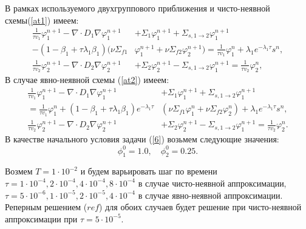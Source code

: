 В рамках используемого двухгруппового приближения и чисто-неявной схемы(\ref{at1}) имеем: 
\begin{equation}\label{n1}
\begin{split}
\frac{1}{\tau v_1} \varphi_1^{n+1} - \nabla \cdot D_1 \nabla \varphi_1^{n+1} & + \Sigma_1 \varphi_1^{n+1} + \Sigma_{s,1\rightarrow 2} \varphi_1^{n+1}\\  
 -(1-\beta_1+\tau\lambda_1\beta_1)(\nu \Sigma_{f1} &\varphi_1^{n+1} + \nu \Sigma_{f2} \varphi_2^{n+1}) 
 = \frac{1}{\tau v_1}   \varphi_1^{n} + \lambda_1 e^{-\lambda_1\tau}s^n, \\
\frac{1}{\tau v_2} \varphi_2^{n+1} - \nabla \cdot D_2 \nabla \varphi_2^{n+1} & + \Sigma_2 \varphi_2^{n+1} - \Sigma_{s,1\rightarrow 2} \varphi_1^{n+1}  
 = \frac{1}{\tau v_2}\varphi_2^{n}, 
\end{split}
\end{equation} 
В случае явно-неявной схемы (\ref{at2}) имеем:
\begin{equation}\label{n2}
\begin{split}
\frac{1}{\tau v_1} \varphi_1^{n+1} - \nabla \cdot D_1 \nabla \varphi_1^{n+1} & + \Sigma_1 \varphi_1^{n+1} + \Sigma_{s,1\rightarrow 2} \varphi_1^{n+1} \\ 
 = \frac{1}{\tau v_1}   \varphi_1^{n} + (1-\beta_1 + \tau\lambda_1\beta_1)e^{-\lambda_1\tau}&(\nu \Sigma_{f1} \varphi_1^{n} + \nu \Sigma_{f2} \varphi_2^{n})+\lambda_1 e^{-\lambda_1\tau} s^n, \\
\frac{1}{\tau v_2} \varphi_2^{n+1} - \nabla \cdot D_2 \nabla \varphi_2^{n+1} & + \Sigma_2 \varphi_2^{n+1} - \Sigma_{s,1\rightarrow 2} \varphi_1^{n+1}  
 = \frac{1}{\tau v_2}\varphi_2^{n}.
\end{split}
\end{equation} 
В качестве начального условия задачи (\ref{6}) возьмем следующие значения: 
\[ 
\phi_1^0 = 1.0, \quad \phi_2^0 = 0.25.
\]

Возмем $T=1\cdot 10^{-2}$ и будем варьировать шаг по времени $\tau = 1\cdot 10^{-4}, 2\cdot 10^{-4}, 4\cdot 10^{-4}, 8\cdot 10^{-4}$ в случае чисто-неявной аппроксимации,  $\tau=5\cdot 10^{-6}, 1\cdot 10^{-5},2\cdot 10^{-5}, 4\cdot 10^{-4}$ в случае явно-неявной аппроксимации. Реперным решением ($ref$) для обоих случаев будет решение при чисто-неявной аппроксимации при $\tau = 5 \cdot 10^{-5}$.\\

